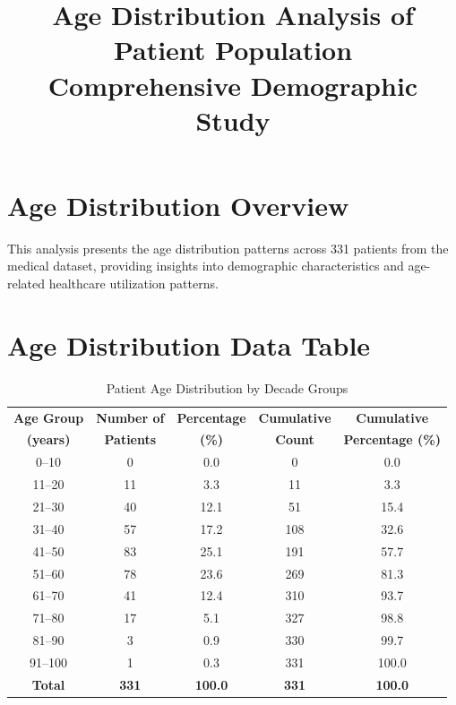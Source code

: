 \documentclass[10pt]{article}
\begin{document}
\title{Age Distribution Analysis of Patient Population\\{\large Comprehensive Demographic Study}}
\author{}
\date{}
\maketitle

\section{Age Distribution Overview}

This analysis presents the age distribution patterns across 331 patients from the medical dataset, providing insights into demographic characteristics and age-related healthcare utilization patterns.

\section{Age Distribution Data Table}

\begin{table}[h!]
\centering
\caption{Patient Age Distribution by Decade Groups}
\begin{tabular}{c|c|c|c|c}
\toprule
\rowcolor{headercolor}
\textbf{Age Group} & \textbf{Number of} & \textbf{Percentage} & \textbf{Cumulative} & \textbf{Cumulative} \\
\rowcolor{headercolor}
\textbf{(years)} & \textbf{Patients} & \textbf{(\%)} & \textbf{Count} & \textbf{Percentage (\%)} \\
\midrule
0--10 & 0 & 0.0 & 0 & 0.0 \\
\rowcolor{altrowcolor}
11--20 & 11 & 3.3 & 11 & 3.3 \\
21--30 & 40 & 12.1 & 51 & 15.4 \\
\rowcolor{altrowcolor}
31--40 & 57 & 17.2 & 108 & 32.6 \\
41--50 & 83 & 25.1 & 191 & 57.7 \\
\rowcolor{altrowcolor}
51--60 & 78 & 23.6 & 269 & 81.3 \\
61--70 & 41 & 12.4 & 310 & 93.7 \\
\rowcolor{altrowcolor}
71--80 & 17 & 5.1 & 327 & 98.8 \\
81--90 & 3 & 0.9 & 330 & 99.7 \\
\rowcolor{altrowcolor}
91--100 & 1 & 0.3 & 331 & 100.0 \\
\midrule
\rowcolor{headercolor}
\textbf{Total} & \textbf{331} & \textbf{100.0} & \textbf{331} & \textbf{100.0} \\
\bottomrule
\end{tabular}
\end{table}
\end{document}
